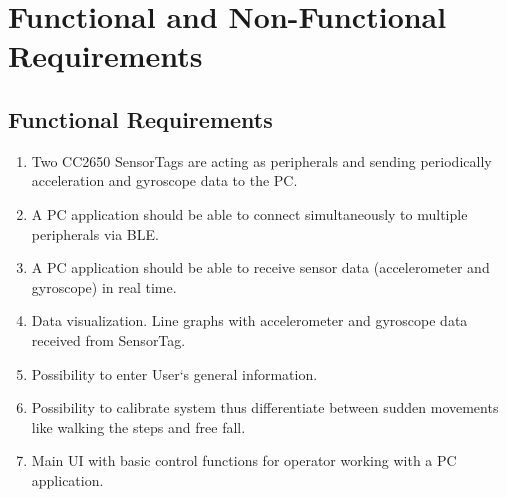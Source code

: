 \documentclass[hidelinks,conference,12pt]{IEEETran}
\begin{document}
\section{Functional and Non-Functional Requirements}
\subsection{Functional Requirements}
\begin{enumerate}
	\item Two CC2650 SensorTags are acting as peripherals and sending periodically acceleration and gyroscope data to the PC.
	\item A PC application should be able to connect simultaneously to multiple peripherals via BLE.
	\item A PC application should be able to receive sensor data (accelerometer and gyroscope) in real time.
	\item Data visualization. Line graphs with accelerometer and gyroscope data received from SensorTag.
	\item Possibility to enter User‘s general information.
	\item Possibility to calibrate system thus differentiate between sudden movements like walking the steps and free fall.
	\item Main UI with basic control functions for operator working with a PC application.		
\end{enumerate}
\end{document}
